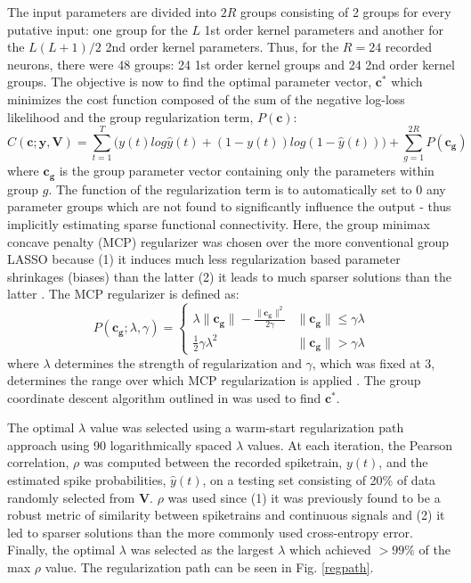 \documentclass[11pt,a4paper,final]{article}
\begin{document}
The input parameters are divided into $2R$ groups consisting of 2 groups for every putative input: one group for the $L$ 1st order kernel parameters and another for the $L(L+1)/2$ 2nd order kernel parameters.
Thus, for the $R=24$ recorded neurons, there were 48 groups: 24 1st order kernel groups and 24 2nd order kernel groups. 
The objective is now to find the optimal parameter vector, $\bm{c}^*$ which minimizes the cost function composed of the sum of the negative log-loss likelihood and the group regularization term, $P(\bm{c})$:
\begin{equation}
C(\bm{c};\bm{y},\bm{V})=\sum_{t=1}^T\Big(y(t)log\hat{y}(t)+(1-y(t))log(1-\hat{y}(t))\Big)+\sum_{g=1}^{2R}P(\bm{c_g})
\label{eq:cost}
\end{equation}
where $\bm{c_g}$ is the group parameter vector containing only the parameters within group $g$.
The function of the regularization term is to automatically set to 0 any parameter groups which are not found to significantly influence the output - thus implicitly estimating sparse functional connectivity.
Here, the group minimax concave penalty (MCP) regularizer was chosen over the more conventional group LASSO because (1) it induces much less regularization based parameter shrinkages (biases) than the latter (2) it leads to much sparser solutions than the latter \citep{breheny15,zhang10}.
The MCP regularizer is defined as:
\begin{equation}
P(\bm{c_g};\lambda,\gamma) =
\begin{cases}
\lambda\|\bm{c_g}\|-\frac{\|\bm{c_g}\|^2}{2\gamma}  & \|\bm{c_g}\| \leq \gamma\lambda \\
\frac{1}{2}\gamma\lambda^2                          & \|\bm{c_g}\| >    \gamma\lambda
\end{cases}
\end{equation}
where $\lambda$ determines the strength of regularization and $\gamma$, which was fixed at 3, determines the range over which MCP regularization is applied \citep{breheny15}.
The group coordinate descent algorithm outlined in \citet{breheny15} was used to find $\bm{c}^*$.

The optimal $\lambda$ value was selected using a warm-start regularization path approach using 90 logarithmically spaced $\lambda$ values.
At each iteration, the Pearson correlation, $\rho$ was computed between the recorded spiketrain, $y(t)$, and the estimated spike probabilities, $\hat{y}(t)$, on a testing set consisting of 20\% of data randomly selected from $\bm{V}$.
$\rho$ was used since (1) it was previously found to be a robust metric of similarity between spiketrains and continuous signals \citep{sandler14} and (2) it led to sparser solutions than the more commonly used cross-entropy error.
Finally, the optimal $\lambda$ was selected as the largest $\lambda$ which achieved $>99\%$ of the max $\rho$ value.
The regularization path can be seen in Fig. \ref{regpath}.
\end{document}
